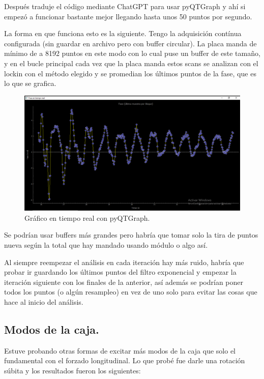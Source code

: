 Después traduje el código mediante ChatGPT para usar pyQTGraph y ahí si empezó a funcionar bastante mejor llegando hasta unos 50 puntos por segundo. 



La forma en que funciona esto es la siguiente. Tengo la adquisición contínua configurada (sin guardar en archivo pero con buffer circular). La placa manda de mínimo de a 8192 puntos en este modo con lo cual puse un buffer de este tamaño, y en el bucle principal cada vez que la placa manda estos scans se analizan con el lockin con el método elegido y se promedian los últimos puntos de la fase, que es lo que se grafica. 

\begin{figure}[th!]
	\centering
	\includegraphics[width=0.7\linewidth]{Figures/16_06_2025/Tiempo_real_pyqtgraph}
	\caption{Gráfico en tiempo real con pyQTGraph.}
	\label{fig:tiemporealpyqtgraph}
\end{figure}


Se podrían usar buffers más grandes pero habría que tomar solo la tira de puntos nueva según la total que hay mandado usando módulo o algo así.  

Al siempre reempezar el análisis en cada iteración hay más ruido, habría que probar ir guardando los últimos puntos del filtro exponencial y empezar la iteración siguiente con los finales de la anterior, así además se podrían poner todos los puntos (o algún resampleo) en vez de uno solo para evitar las cosas que hace al inicio del análisis.

\subsection*{Modos de la caja.}
Estuve probando otras formas de excitar más modos de la caja que solo el fundamental con el forzado longitudinal. Lo que probé fue darle una rotación súbita y los resultados fueron los siguientes:

